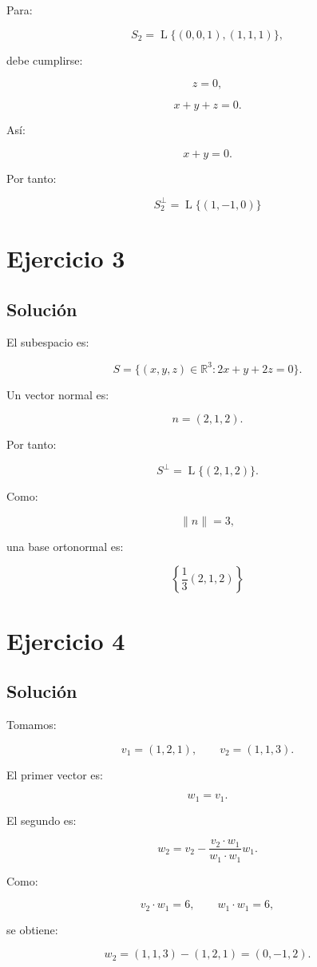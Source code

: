 \documentclass[11pt,a4paper]{article}
\newcommand{\R}{\mathbb{R}}
\newcommand{\Span}{\operatorname{L}}
\begin{document}
Para:

\[
S_2
=
\Span\{(0,0,1),(1,1,1)\},
\]

debe cumplirse:

\[
z=0,
\]

\[
x+y+z=0.
\]

Así:

\[
x+y=0.
\]

Por tanto:

\[
\boxed{
S_2^\perp
=
\Span\{(1,-1,0)\}
}
\]

\section{Ejercicio 3}
\subsection{Solución}

El subespacio es:

\[
S=
\{(x,y,z)\in\R^3:
2x+y+2z=0\}.
\]

Un vector normal es:

\[
n=(2,1,2).
\]

Por tanto:

\[
S^\perp
=
\Span\{(2,1,2)\}.
\]

Como:

\[
\|n\|=3,
\]

una base ortonormal es:

\[
\boxed{
\left\{
\frac13(2,1,2)
\right\}
}
\]

\section{Ejercicio 4}
\subsection{Solución}

Tomamos:

\[
v_1=(1,2,1),
\qquad
v_2=(1,1,3).
\]

El primer vector es:

\[
w_1=v_1.
\]

El segundo es:

\[
w_2
=
v_2
-
\frac{v_2\cdot w_1}{w_1\cdot w_1}w_1.
\]

Como:

\[
v_2\cdot w_1=6,
\qquad
w_1\cdot w_1=6,
\]

se obtiene:

\[
w_2
=
(1,1,3)-(1,2,1)
=
(0,-1,2).
\]
\end{document}
